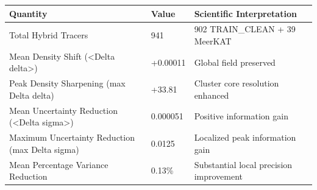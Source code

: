 \begin{tabular}{lll}
\hline
Quantity & Value & Scientific Interpretation \\
\hline
Total Hybrid Tracers & 941 & 902 TRAIN\_CLEAN + 39 MeerKAT \\
Mean Density Shift (<Delta delta>) & +0.00011 & Global field preserved \\
Peak Density Sharpening (max Delta delta) & +33.81 & Cluster core resolution enhanced \\
Mean Uncertainty Reduction (<Delta sigma>) & 0.000051 & Positive information gain \\
Maximum Uncertainty Reduction (max Delta sigma) & 0.0125 & Localized peak information gain \\
Mean Percentage Variance Reduction & 0.13\% & Substantial local precision improvement \\
\hline
\end{tabular}

